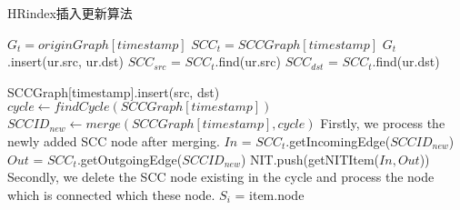 \documentclass{article}
\begin{document}
\begin{algorithm}
\caption{HRindex插入更新算法}

\begin{algorithmic}[1]
    \State $G_{t} = originGraph[timestamp]$
    \State $SCC_{t} = SCCGraph[timestamp]$
        \State {}
    \EndIf
        \State {}
    \EndIf
    \State $G_t$.insert(ur.src, ur.dst)
    \State $SCC_{src}$ = $SCC_t$.find(ur.src)
    \State $SCC_{dst}$ = $SCC_t$.find(ur.dst)

        \State \Return
    \Else
        \State SCCGraph[timestamp].insert(src, dst)
        \State $cycle \gets findCycle(SCCGraph[timestamp])$
            \State $SCCID_{new} \gets merge(SCCGraph[timestamp], cycle)$
            \State \Comment Firstly, we process the newly added SCC node after merging.
            \State $In$ = $SCC_t$.getIncomingEdge($SCCID_{new}$)
            \State $Out$ = $SCC_t$.getOutgoingEdge($SCCID_{new}$)
            \Else 
                \State NIT.push(getNITItem($In, Out$)) 
            \EndIf
            \State \Comment Secondly, we delete the SCC node existing in the cycle and process the node which is connected which these node.
                \State $S_i$ = item.node
                    
                \Else 
                \EndIf  
            \EndFor
        \EndWhile

    \EndIf
\EndFunction


\end{algorithmic}
\end{algorithm}
\end{document}

